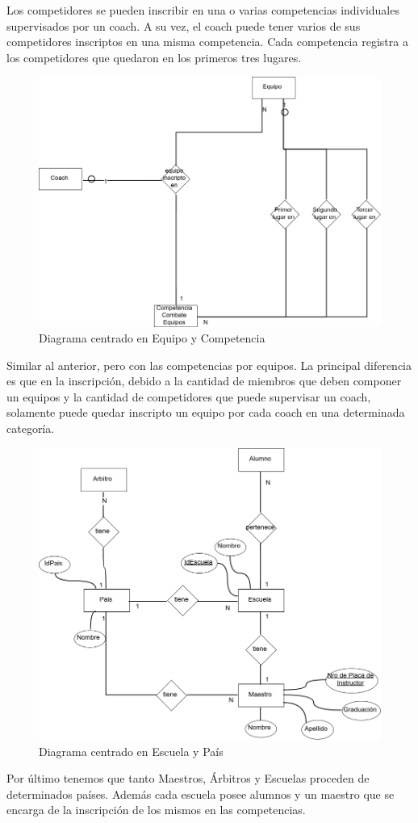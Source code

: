 Los competidores se pueden inscribir en una o varias competencias individuales supervisados por un coach. A su
vez, el coach puede tener varios de sus competidores inscriptos en una misma competencia. Cada competencia registra a los
competidores que quedaron en los primeros tres lugares.

\begin{figure}[H]
  \centering
    \includegraphics[scale=0.5]{imagenes/EquipoCompetencia.png}
  \caption{Diagrama centrado en Equipo y Competencia}
\end{figure}

Similar al anterior, pero con las competencias por equipos. La principal diferencia es que en la inscripción, debido a
la cantidad de miembros que deben componer un equipos y la cantidad de competidores que puede supervisar un coach, solamente puede quedar inscripto un equipo por cada
coach en una determinada categoría.

\begin{figure}[H]
  \centering
    \includegraphics[scale=0.5]{imagenes/EscuelaPais.png}
  \caption{Diagrama centrado en Escuela y País}
\end{figure}

Por último tenemos que tanto Maestros, Árbitros y Escuelas proceden de determinados países. Además cada
escuela posee alumnos y un maestro que se encarga de la inscripción de los mismos en las competencias.
